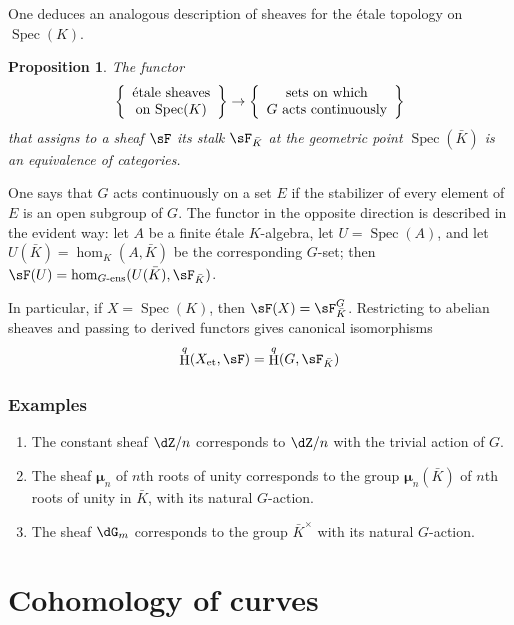 \documentclass[12pt,oneside,english]{smfbook}
\DeclareMathOperator{\h}{H}
\DeclareMathOperator{\spec}{Spec}
\newcommand{\dmu}{{\bm\mu}}
\newcommand{\et}[1]{{#1}_{\textnormal{et}}}
\newtheorem{proposition}[subsubsection]{Proposition}
\begin{document}
One deduces an analogous description of sheaves for the étale topology on $\spec(K)$.

\begin{proposition}\label{I:2-4-4}
The functor
\[
  \left\{\begin{array}{c}
          \textnormal{étale sheaves} \\
          \textnormal{on $\spec(K)$}
        \end{array}\right\}
  \to
  \left\{\begin{array}{c}
          \textnormal{sets on which} \\
          \textnormal{$G$ acts continuously}
        \end{array}\right\}
\]
that assigns to a sheaf $\sF$ its stalk $\sF_{\bar K}$ at the geometric point $\spec(\bar K)$ is an equivalence of categories.
\end{proposition}

One says that $G$ acts continuously on a set $E$ if the stabilizer of every element of $E$ is an open subgroup of $G$. The functor in the opposite direction is described in the evident way: let $A$ be a finite étale $K$-algebra, let $U=\spec(A)$, and let $U(\bar K)=\hom_K(A,\bar K)$ be the corresponding $G$-set; then $\sF(U)= \hom_{G\text{-ens}}(U(\bar K),\sF_{\bar K})$.

In particular, if $X=\spec(K)$, then $\sF(X)=\sF_{\bar K}^G$. Restricting to abelian sheaves and passing to derived functors gives canonical isomorphisms
\[
  \h^q(\et X,\sF) = \h^q(G,\sF_{\bar K})
\]

\subsubsection{Examples}\label{I:2-4-5}

\begin{enumerate}[\indent a)]
  \item The constant sheaf $\dZ/n$ corresponds to $\dZ/n$ with the trivial action of $G$.
  \item The sheaf $\dmu_n$ of $n$th roots of unity corresponds to the group $\dmu_n(\bar K)$ of $n$th roots of unity in $\bar K$, with its natural $G$-action.
  \item The sheaf $\dG_m$ corresponds to the group $\bar K^\times$ with its natural $G$-action.
\end{enumerate}

\section{Cohomology of curves}\label{I:3}
\end{document}
